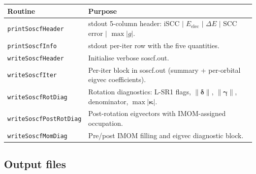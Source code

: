 \documentclass[11pt,a4paper]{article}
\newcommand{\kkappa}{\bm{\kappa}}
\begin{document}
\begin{center}
\begin{tabular}{ll}
\toprule
Routine & Purpose \\
\midrule
\texttt{printSoscfHeader}   & stdout 5-column header: iSCC $|$ $E_\mathrm{elec}$ $|$ $\Delta E$ $|$ SCC error $|$ $\max|g|$. \\
\texttt{printSoscfInfo}     & stdout per-iter row with the five quantities. \\
\texttt{writeSoscfHeader}   & Initialise verbose soscf.out. \\
\texttt{writeSoscfIter}     & Per-iter block in soscf.out (summary + per-orbital eigvec coefficients). \\
\texttt{writeSoscfRotDiag}  & Rotation diagnostics: L-SR1 flags, $\|\bm{\delta}\|$, $\|\bm{\gamma}\|$, denominator, $\max|\kkappa|$. \\
\texttt{writeSoscfPostRotDiag} & Post-rotation eigvectors with IMOM-assigned occupation. \\
\texttt{writeSoscfMomDiag}  & Pre/post IMOM filling and eigvec diagnostic block. \\
\bottomrule
\end{tabular}
\end{center}

\subsection{Output files}
\end{document}
